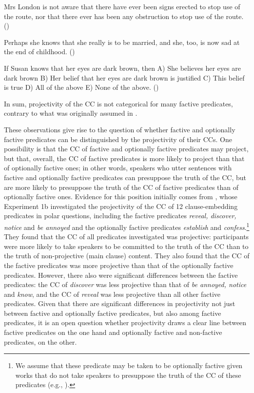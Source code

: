 \documentclass[11pt,fleqn]{article}
\newcommand{\6}{\mbox{$[\hspace*{-.6mm}[$}}
\newcommand{\9}{\mbox{$]\hspace*{-.6mm}]$}}
\begin{document}
\begin{exe}
\ex\label{nat2}

\begin{xlist}

\ex Mrs London is not aware that there have ever been signs erected to stop use of the route, nor that there ever has been  any obstruction to stop use of the route. \hfill (\citealt[83]{beaver-belly})

\ex Perhaps she knows that she really is to be married, and she, too, is now sad at the end of childhood. \hfill (\citealt[86]{beaver-belly})

\ex If Susan knows that her eyes are dark brown, then A) She believes her eyes are dark brown B) Her belief that her eyes are dark brown is justified C) This belief is true D) All of the above E) None of the above. \hfill (\citealt[84]{beaver-belly})

\end{xlist}
\end{exe}
In sum, projectivity of the CC is not categorical for many factive predicates, contrary to what was originally assumed in \citealt{kiparsky-kiparsky70}. 

These observations give rise to the question of whether factive and optionally factive predicates can be distinguished by the projectivity of their CCs. One possibility is that the CC of factive and optionally factive predicates may project, but that, overall, the CC of factive predicates is more likely to project than that of optionally factive ones; in other words, speakers who utter sentences with factive and optionally factive predicates can presuppose the truth of the CC, but are more likely to presuppose the truth of the CC of factive predicates than of optionally factive ones. Evidence for this position initially comes from \citealt*{tbd-variability}, whose Experiment 1b investigated the projectivity of the CC of 12 clause-embedding predicates in polar questions, including the factive predicates {\em reveal, discover, notice} and {\em be annoyed} and the optionally factive predicates {\em establish} and {\em confess}.\footnote{We assume that these predicate may be taken to be optionally factive given works that do not take speakers to presuppose the truth of the CC of these predicates (e.g., \citealt{wyse,swanson2012,karttunen2016}).} They found that the CC of all predicates investigated was projective: participants were more likely to take speakers to be committed to the truth of the CC than to the truth of non-projective (main clause) content. They also found that the CC of the factive predicates was more projective than that of the optionally factive predicates. However, there also were significant differences between the factive predicates: the CC of {\em discover} was less projective than that of {\em be annoyed, notice} and {\em know}, and the CC of {\em reveal} was less projective than all other factive predicates. Given that there are significant differences in projectivity not just between factive and optionally factive predicates, but also among factive predicates, it is an open question whether projectivity draws a clear line between factive predicates on the one hand and optionally factive and non-factive predicates, on the other.
\end{document}
